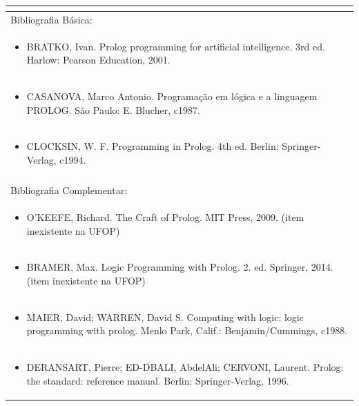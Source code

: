 \documentclass[11pt]{article}
\begin{document}
\begin{center}
\begin{longtable}{|p{4cm}|p{4cm}|p{4cm}|p{4cm}|}
\multicolumn{4}{|p{\dimexpr 16cm + 6\tabcolsep\relax}|}{}\\
\hline
\multicolumn{4}{|p{16cm}|}{Bibliografia Básica:}\\*
\multicolumn{4}{|p{\dimexpr 16cm + 6\tabcolsep\relax}|}{\begin{itemize}\item BRATKO, Ivan. Prolog programming for artificial intelligence. 3rd ed. Harlow: Pearson Education, 2001.\end{itemize}}\\
\multicolumn{4}{|p{\dimexpr 16cm + 6\tabcolsep\relax}|}{\begin{itemize}\item CASANOVA, Marco Antonio. Programação em lógica e a linguagem PROLOG. São Paulo: E. Blucher, c1987.\end{itemize}}\\
\multicolumn{4}{|p{\dimexpr 16cm + 6\tabcolsep\relax}|}{\begin{itemize}\item CLOCKSIN, W. F. Programming in Prolog. 4th ed. Berlin: Springer-Verlag, c1994.\end{itemize}}\\
\multicolumn{4}{|p{16cm}|}{}\\
\hline
\multicolumn{4}{|p{16cm}|}{Bibliografia Complementar:}\\*
\multicolumn{4}{|p{\dimexpr 16cm + 6\tabcolsep\relax}|}{\begin{itemize}\item O'KEEFE, Richard. The Craft of Prolog. MIT Press, 2009. (item inexistente na UFOP)\end{itemize}}\\
\multicolumn{4}{|p{\dimexpr 16cm + 6\tabcolsep\relax}|}{\begin{itemize}\item BRAMER, Max. Logic Programming with Prolog. 2. ed. Springer, 2014. (item inexistente na UFOP)\end{itemize}}\\
\multicolumn{4}{|p{\dimexpr 16cm + 6\tabcolsep\relax}|}{\begin{itemize}\item MAIER, David; WARREN, David S. Computing with logic: logic programming with prolog. Menlo Park, Calif.: Benjamin/Cummings, c1988.\end{itemize}}\\
\multicolumn{4}{|p{\dimexpr 16cm + 6\tabcolsep\relax}|}{\begin{itemize}\item DERANSART, Pierre; ED-DBALI, AbdelAli; CERVONI, Laurent. Prolog: the standard: reference manual. Berlin: Springer-Verlag, 1996.\end{itemize}}\\

\end{longtable}
\end{center}
\end{document}

